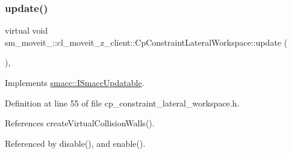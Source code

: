 \subsubsection{\texorpdfstring{update()}{update()}}
{\footnotesize\ttfamily virtual void sm\+\_\+moveit\+\_\+::cl\+\_\+moveit\+\_\+z\+\_\+client\+::\+Cp\+Constraint\+Lateral\+Workspace\+::update (\begin{DoxyParamCaption}{ }\end{DoxyParamCaption})\hspace{0.3cm}{\ttfamily [inline]}, {\ttfamily [virtual]}}



Implements \hyperlink{classsmacc_1_1ISmaccUpdatable_a84ee0520cbefdb1d412bed54650b028e}{smacc\+::\+I\+Smacc\+Updatable}.



Definition at line 55 of file cp\+\_\+constraint\+\_\+lateral\+\_\+workspace.\+h.



References create\+Virtual\+Collision\+Walls().



Referenced by disable(), and enable().


